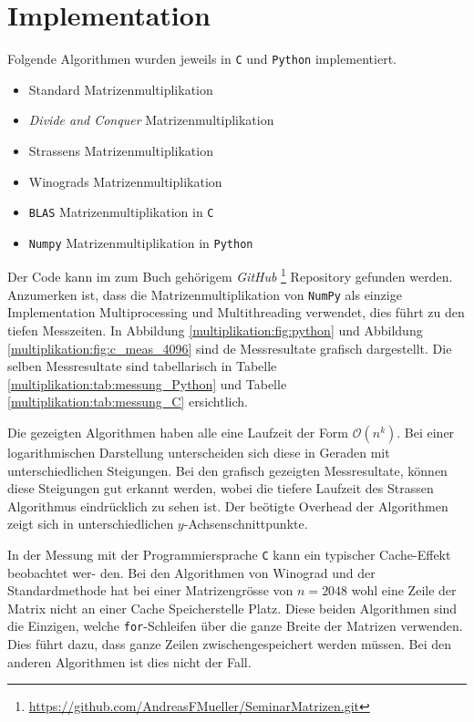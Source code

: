 \section{Implementation}\label{multiplikation:section:Implementation}

Folgende Algorithmen wurden jeweils in \texttt{C} und \texttt{Python} implementiert.
\begin{itemize}
	\item Standard Matrizenmultiplikation
	\item \textit{Divide and Conquer} Matrizenmultiplikation
	\item Strassens Matrizenmultiplikation
	\item Winograds Matrizenmultiplikation
	\item \texttt{BLAS} Matrizenmultiplikation in \texttt{C}
	\item \texttt{Numpy} Matrizenmultiplikation in \texttt{Python}
\end{itemize}

Der Code kann im zum Buch gehörigem \textit{GitHub} \footnote{\url{https://github.com/AndreasFMueller/SeminarMatrizen.git}} Repository gefunden werden.
Anzumerken ist, dass die Matrizenmultiplikation von \texttt{NumPy} als einzige Implementation Multiprocessing und Multithreading verwendet, dies f\"uhrt zu den tiefen Messzeiten.
In Abbildung \ref{multiplikation:fig:python} und Abbildung \ref{multiplikation:fig:c_meas_4096} sind de Messresultate grafisch dargestellt. Die selben Messresultate sind tabellarisch in Tabelle \ref{multiplikation:tab:messung_Python} und Tabelle \ref{multiplikation:tab:messung_C} ersichtlich.

Die gezeigten Algorithmen haben alle eine Laufzeit der Form $\mathcal{O}(n^k) $.
Bei einer logarithmischen Darstellung unterscheiden sich diese in Geraden mit unterschiedlichen Steigungen.
Bei den grafisch gezeigten Messresultate, können diese Steigungen gut erkannt werden, wobei die tiefere Laufzeit des Strassen Algorithmus eindrücklich zu sehen ist.
Der beötigte Overhead der Algorithmen zeigt sich in unterschiedlichen $y$-Achsenschnittpunkte.

In der Messung mit der Programmiersprache \texttt{C} kann ein typischer Cache-Effekt beobachtet wer-
den.
Bei den Algorithmen von Winograd und der Standardmethode hat bei einer Matrizengrösse von $n = 2048$ wohl eine Zeile der Matrix nicht an einer Cache Speicherstelle Platz.
Diese beiden Algorithmen sind die Einzigen, welche \texttt{for}-Schleifen über die ganze Breite der Matrizen verwenden.
Dies führt dazu, dass ganze Zeilen zwischengespeichert werden müssen.
Bei den anderen Algorithmen ist dies nicht der Fall.

